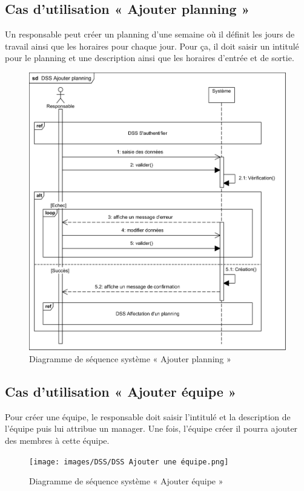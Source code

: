    \subsection{Cas d'utilisation « Ajouter planning »}
    Un responsable peut créer un planning d’une semaine où il définit les jours de travail ainsi que les horaires pour chaque jour. Pour ça, il doit saisir un intitulé pour le planning et une description ainsi que les horaires d’entrée et de sortie.   
        \begin{figure}[h!]
             \centering
            \includegraphics[scale=1]{images/DSS/DSS Ajouter planning.png}
             \caption{Diagramme de séquence système « Ajouter planning »}
             \label{fig4}
        \end{figure}
        
    \subsection{Cas d'utilisation « Ajouter équipe »}
    Pour créer une équipe, le responsable doit saisir l’intitulé et la description de l’équipe puis lui attribue un manager. Une fois, l’équipe créer il pourra ajouter des membres à cette équipe.   
    \clearpage
        \begin{figure}[h!]
             \centering
            \texttt{[image: images/DSS/DSS Ajouter une équipe.png]}
             \caption{Diagramme de séquence système « Ajouter équipe »}
             \label{fig4}
        \end{figure}
        
